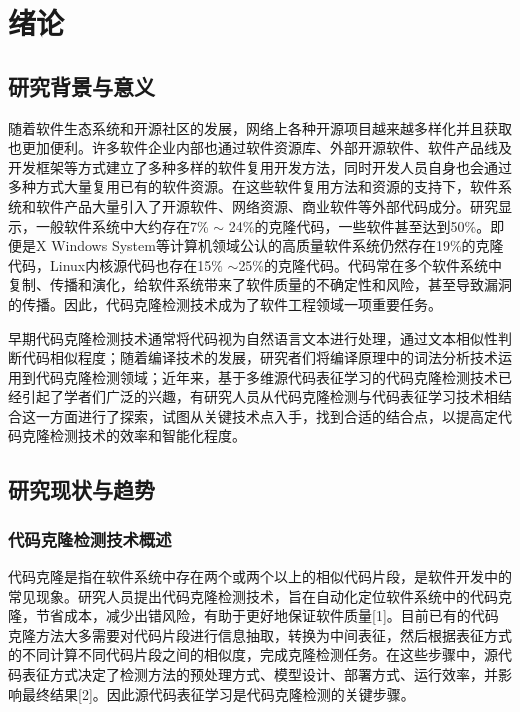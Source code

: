 \chapter{绪论}
\label{chap:intro}
\section{研究背景与意义}

随着软件生态系统和开源社区的发展，网络上各种开源项目越来越多样化并且获取也更加便利。许多软件企业内部也通过软件资源库、外部开源软件、软件产品线及开发框架等方式建立了多种多样的软件复用开发方法，同时开发人员自身也会通过多种方式大量复用已有的软件资源。在这些软件复用方法和资源的支持下，软件系统和软件产品大量引入了开源软件、网络资源、商业软件等外部代码成分。研究显示，一般软件系统中大约存在7\% $\sim$ 24\%的克隆代码，一些软件甚至达到50\%。即便是X Windows System等计算机领域公认的高质量软件系统仍然存在19\%的克隆代码，Linux内核源代码也存在15\% $\sim$25\%的克隆代码。代码常在多个软件系统中复制、传播和演化，给软件系统带来了软件质量的不确定性和风险，甚至导致漏洞的传播。因此，代码克隆检测技术成为了软件工程领域一项重要任务。

早期代码克隆检测技术通常将代码视为自然语言文本进行处理，通过文本相似性判断代码相似程度；随着编译技术的发展，研究者们将编译原理中的词法分析技术运用到代码克隆检测领域；近年来，基于多维源代码表征学习的代码克隆检测技术已经引起了学者们广泛的兴趣，有研究人员从代码克隆检测与代码表征学习技术相结合这一方面进行了探索，试图从关键技术点入手，找到合适的结合点，以提高定代码克隆检测技术的效率和智能化程度。


\section{研究现状与趋势}

\subsection{代码克隆检测技术概述}
代码克隆是指在软件系统中存在两个或两个以上的相似代码片段，是软件开发中的常见现象。研究人员提出代码克隆检测技术，旨在自动化定位软件系统中的代码克隆，节省成本，减少出错风险，有助于更好地保证软件质量[1]。目前已有的代码克隆方法大多需要对代码片段进行信息抽取，转换为中间表征，然后根据表征方式的不同计算不同代码片段之间的相似度，完成克隆检测任务。在这些步骤中，源代码表征方式决定了检测方法的预处理方式、模型设计、部署方式、运行效率，并影响最终结果[2]。因此源代码表征学习是代码克隆检测的关键步骤。

